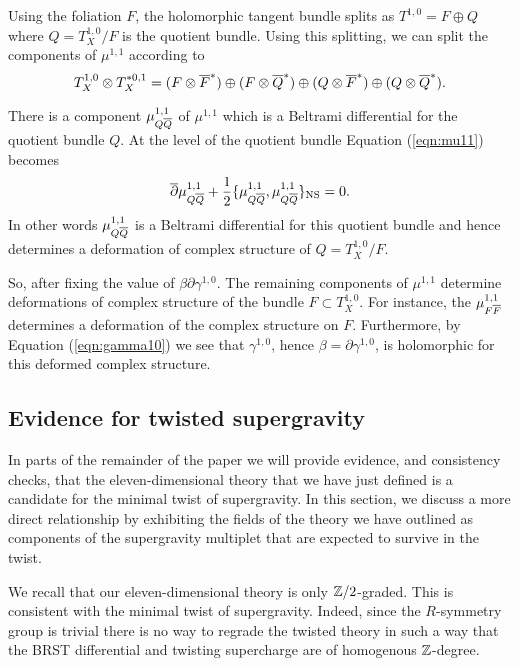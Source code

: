 \documentclass[11pt]{amsart}
\begin{document}
Using the foliation $F$, the holomorphic tangent bundle splits as $T^{1,0} = F \oplus Q$ where $Q = T^{1,0}_X / F$ is the quotient bundle.
Using this splitting, we can split the components of $\mu^{1,1}$ according to
\[
  T^{1,0}_X \otimes T^{*0,1}_X = (F \otimes\Bar{F}^*) \oplus (F \otimes \Bar{Q}^*) \oplus (Q \otimes \Bar{F}^*) \oplus (Q \otimes \Bar{Q}^*) .
\]

There is a component $\mu_{Q\Bar{Q}}^{1,1}$ of $\mu^{1,1}$ which is a Beltrami differential for the quotient bundle $Q$.
At the level of the quotient bundle Equation (\ref{eqn:mu11}) becomes
\[
  \dbar \mu^{1,1}_{Q \Bar{Q}} + \frac12 \{\mu^{1,1}_{Q \Bar{Q}} , \mu^{1,1}_{Q \Bar{Q}}\}_{\rm NS} = 0 .
\]
In other words $\mu^{1,1}_{Q \Bar{Q}}$ is a Beltrami differential for this quotient bundle and hence determines a deformation of complex structure of $Q = T^{1,0}_X / F$.

So, after fixing the value of $\beta \partial \gamma^{1,0}$.
The remaining components of $\mu^{1,1}$ determine deformations of complex structure of the bundle $F \subset T^{1,0}_X$.
For instance, the $\mu^{1,1}_{F \Bar{F}}$ determines a deformation of the complex structure on $F$.
Furthermore, by Equation (\ref{eqn:gamma10}) we see that $\gamma^{1,0}$, hence $\beta = \partial \gamma^{1,0}$, is holomorphic for this deformed complex structure.


\subsection{Evidence for twisted supergravity}\label{sec:evidence}


In parts of the remainder of the paper we will provide evidence, and consistency checks, that the eleven-dimensional theory that we have just defined is a candidate for the minimal twist of supergravity.
In this section, we discuss a more direct relationship by exhibiting the fields of the theory we have outlined as components of the supergravity multiplet that are expected to survive in the twist.

We recall that our eleven-dimensional theory is only $\ZZ/2$-graded.
This is consistent with the minimal twist of supergravity.
Indeed, since the $R$-symmetry group is trivial there is no way to regrade the twisted theory in such a way that the BRST differential and twisting supercharge are of homogenous $\ZZ$-degree.
\end{document}
